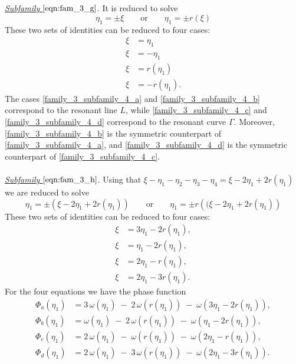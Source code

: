 \documentclass[reqno,english,11pt]{amsart}
\theoremstyle{definition}
\numberwithin{equation}{section}
\begin{document}
\\\\
\noindent
{\it \underline{Subfamily $\eqref{eqn:fam_3_g}$}}.
It is reduced to solve
$$\eta_1=\pm \xi\qquad \text{or}\qquad \eta_1=\pm r(\xi)$$
These two sets of identities can be reduced to four cases:
\begin{subequations}
    \begin{align}
         \xi&=\eta_1 \tag{a} \label{family_3_subfamily_4_a}
  \\
  \xi&=-\eta_1 \tag{b} \label{family_3_subfamily_4_b}
 \\
  \xi&=r(\eta_1) \tag{c} \label{family_3_subfamily_4_c}
 \\
   \xi&= -r(\eta_1). \tag{d} \label{family_3_subfamily_4_d}
    \end{align} 
\end{subequations}
The cases \eqref{family_3_subfamily_4_a} and \eqref{family_3_subfamily_4_b} correspond to the resonant line $L$, while \eqref{family_3_subfamily_4_c} and \eqref{family_3_subfamily_4_d} correspond to the resonant curve $\Gamma$. Moreover, \eqref{family_3_subfamily_4_b} is the symmetric counterpart of \eqref{family_3_subfamily_4_a}, and \eqref{family_3_subfamily_4_d} is the symmetric counterpart of \eqref{family_3_subfamily_4_c}.
\\\\
\noindent
{\it \underline{Subfamily $\eqref{eqn:fam_3_h}$}}.
Using that $\xi-\eta_1-\eta_2-\eta_3-\eta_4=\xi-2\eta_1+2r(\eta_1)$ we are reduced to solve
$$\eta_1=\pm \left(\xi-2\eta_1+2r(\eta_1)\right)\qquad \text{or}\qquad \eta_1=\pm r\left((\xi-2\eta_1+2r(\eta_1)\right)$$
These two sets of identities can be reduced to four cases:
\begin{subequations}
    \begin{align}
         \xi&=3\eta_1-2r(\eta_1), \tag{a} \label{family_3_subfamily_5_a}
  \\
  \xi&=\eta_1-2r(\eta_1), \tag{b} \label{family_3_subfamily_5_b}
 \\
  \xi&=2\eta_1-r(\eta_1), \tag{c} \label{family_3_subfamily_5_c}
 \\
   \xi&= 2\eta_1-3r(\eta_1). \tag{d} \label{family_3_subfamily_5_d}
    \end{align} 
\end{subequations}
For the four equations we have the phase function
\begin{align*}
    \Phi_a(\eta_1)&=3\,\omega(\eta_1)\;-\;2\,\omega(r(\eta_1))\;-\;\omega(3\eta_1-2r(\eta_1)),\\
    \Phi_b(\eta_1)&=\omega(\eta_1)\;-\;2\,\omega(r(\eta_1))\;-\;\omega(\eta_1-2r(\eta_1)),\\
    \Phi_c(\eta_1)&=2\,\omega(\eta_1)\;-\;\omega(r(\eta_1))\;-\;\omega(2\eta_1-r(\eta_1)),\\
    \Phi_d(\eta_1)&=2\,\omega(\eta_1)\;-\;3\,\omega(r(\eta_1))\;-\;\omega(2\eta_1-3r(\eta_1)).
\end{align*}
\end{document}
